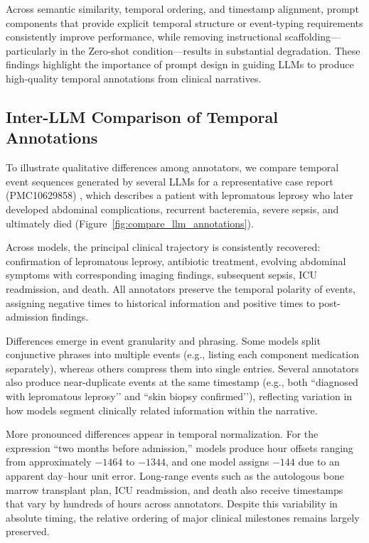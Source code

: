 \documentclass[pdflatex,sn-mathphys-num]{sn-jnl}%
\theoremstyle{thmstyleone}%
\theoremstyle{thmstyletwo}%
\theoremstyle{thmstylethree}%
\begin{document}
Across semantic similarity, temporal ordering, and timestamp alignment, prompt components that provide explicit temporal structure or event-typing requirements consistently improve
performance, while removing instructional scaffolding—particularly in the Zero-shot condition—results in substantial degradation. These findings highlight the importance of prompt
design in guiding LLMs to produce high-quality temporal annotations from clinical narratives.


\subsection{Inter-LLM Comparison of Temporal Annotations} 
\label{apd:inter-llm-comparison}

To illustrate qualitative differences among annotators, we compare temporal event sequences generated by several LLMs for a representative case report (PMC10629858) \citep{abu2023rare}, which describes a patient with lepromatous leprosy who later developed abdominal complications, recurrent bacteremia, severe sepsis, and ultimately died (Figure~\ref{fig:compare_llm_annotations}).



Across models, the principal clinical trajectory is consistently recovered: confirmation of lepromatous leprosy, antibiotic treatment, evolving abdominal symptoms with corresponding imaging findings, subsequent sepsis, ICU readmission, and death. All annotators preserve the
temporal polarity of events, assigning negative times to historical information and positive times to post-admission findings.

Differences emerge in event granularity and phrasing. Some models split conjunctive phrases into multiple events (e.g., listing each component medication separately), whereas others
compress them into single entries. Several annotators also produce near-duplicate events at the same timestamp (e.g., both “diagnosed with lepromatous leprosy’’ and “skin biopsy confirmed’’), reflecting variation in how models segment clinically related information within the narrative.

More pronounced differences appear in temporal normalization. For the expression “two months before admission,” models produce hour offsets ranging from approximately $-1464$ to $-1344$, and one model assigns $-144$ due to an apparent day–hour unit error. Long-range events such as the autologous bone marrow transplant plan, ICU readmission, and death also receive timestamps that vary by hundreds of hours across annotators. Despite this variability in absolute timing,
the relative ordering of major clinical milestones remains largely preserved.
\end{document}
